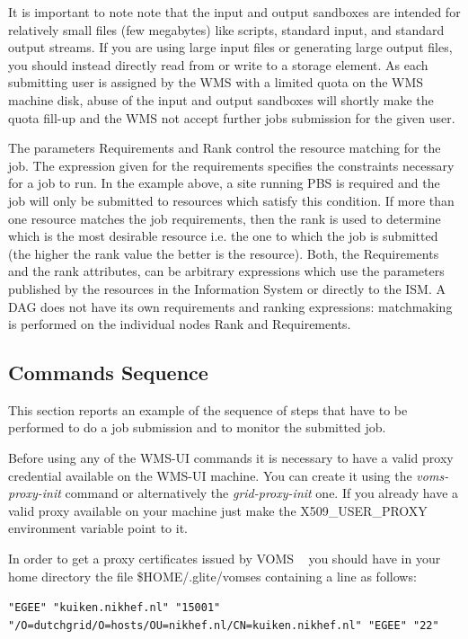 It is important to note note that the input and output sandboxes are intended for relatively small files 
(few megabytes) like scripts, standard input, and standard output streams.
If you are using large input files or generating large output files, you should instead directly read from or 
write to a storage element. As each submitting user is assigned by the WMS with a limited quota on the WMS 
machine disk, abuse of the input and output sandboxes will shortly make the quota fill-up and the WMS not accept 
further jobs submission for the given user. 

The parameters Requirements and Rank control the resource matching for the job. The expression given for the 
requirements specifies the constraints necessary for a job to run. In the example above, a site running PBS is 
required and the job will only be submitted to resources which satisfy this condition. If more than one resource 
matches the job requirements, then the rank is used to determine which is the most desirable resource i.e. the one 
to which the job is submitted (the higher the rank value the better is the resource). 
Both, the Requirements and the rank attributes, can be arbitrary expressions which use the parameters published 
by the resources in the Information System or directly to the ISM.
A DAG does not have its own requirements and ranking expressions: matchmaking is performed on the individual nodes 
Rank and Requirements.

\smallskip
\subsection{Commands Sequence}

This section reports an example of the sequence of steps that have to be performed to do a job submission and to monitor 
the submitted job.
 
Before using any of the WMS-UI commands it is necessary to have a valid proxy credential available on the WMS-UI
machine. You can create it using the \textit{voms-proxy-init} command or alternatively the \textit{grid-proxy-init} one. 
If you already have a valid proxy available on your machine just make the X509\_USER\_PROXY environment variable 
point to it.

In order to get a proxy certificates issued by VOMS ~\cite{voms-core} you should have in your home directory the file 
\$HOME/.glite/vomses containing a line as follows:

\smallskip
{\scriptsize{\verb!"EGEE" "kuiken.nikhef.nl" "15001" "/O=dutchgrid/O=hosts/OU=nikhef.nl/CN=kuiken.nikhef.nl" "EGEE" "22"!}}
\smallskip

